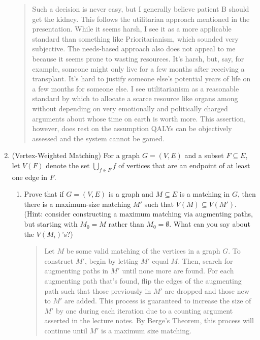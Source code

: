 \documentclass[11pt]{article}
\begin{document}
\begin{enumerate}
\begin{quote}
    \color{purple}
    Such a decision is never easy, but I generally believe patient B should get the kidney. This follows the utilitarian approach mentioned in the presentation. While it seems harsh, I see it as a more applicable standard than something like Prioritarianism, which sounded very subjective. The needs-based approach also does not appeal to me because it seems prone to wasting resources. It's harsh, but, say, for example, someone might only live for a few months after receiving a transplant. It's hard to justify someone else's potential years of life on a few months for someone else. I see utilitarianism as a reasonable standard by which to allocate a scarce resource like organs among without depending on very emotionally and politically charged arguments about whose time on earth is worth more. This assertion, however, does rest on the assumption QALYs can be objectively assessed and the system cannot be gamed.
\end{quote}
 
 \item (Vertex-Weighted Matching)
        For a graph $G=(V,E)$ and a subset $F\subseteq E$, 
        let $V(F)$ denote the set $\bigcup_{f \in F}f$ of 
        vertices that are an endpoint of at least one edge in $F$.
        \begin{enumerate}
        \item Prove that if $G=(V,E)$ is a graph and $M\subseteq E$ is a matching in $G$, then there is a maximum-size matching $M'$ such that $V(M)\subseteq V(M')$.  (Hint: consider constructing a maximum matching via augmenting paths, but starting with $M_0=M$ rather than $M_0=\emptyset$. What can you say about the $V(M_i)$'s?) \label{part:monotonicity}

        \begin{quote}
            \color{purple}
            Let $M$ be some valid matching of the vertices in a graph $G$. To construct $M'$, begin by letting $M'$ equal $M$. Then, search for augmenting paths in $M'$ until none more are found. For each augmenting path that's found, flip the edges of the augmenting path such that those previously in $M'$ are dropped and those new to $M'$ are added. This process is guaranteed to increase the size of $M'$ by one during each iteration due to a counting argument asserted in the lecture notes. By Berge's Theorem, this process will continue until $M'$ is a maximum size matching. \\ 


\end{quote}
\end{enumerate}
\end{enumerate}
\end{document}
